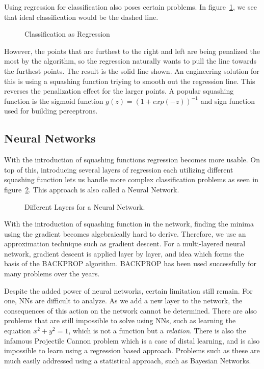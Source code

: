 \documentclass{ecctd01} %
\begin{document}
Using regression for classification also poses certain problems. In
figure~\ref{clasreg1}, we see that ideal classification would be the
dashed line. 

\begin{figure}[htpb]
\vspace{4.0cm}
\caption{\label{clasreg1} Classification as Regression}
\end{figure}

However, the points that are furthest to the right and left are being
penalized the most by the algorithm, so the regression naturally wants
to pull the line towards the furthest points. The result is the solid
line shown. An engineering solution for this is using a squashing
function triying to smooth out the regression line. This reverses the
penalization effect for the larger points. A popular squashing
function is the sigmoid function $g(z) = (1 + exp(-z))^{-1}$ and sign
function used for building perceptrons. 

\subsection{Neural Networks}

With the introduction of squashing functions regression becomes more
usable. On top of this, introducing several layers of regression each
utilizing different squashing function lets us handle more complex
classification problems as seen in figure~\ref{nn1}. This approach is
also called a Neural Network.

\begin{figure}[htpb]
\vspace{3.0cm}
\caption{\label{nn1} Different Layers for a Neural Network.}
\end{figure}

With the introduction of squashing function in the network, finding
the minima using the gradient becomes algebraically hard to
derive. Therefore, we use an approximation technique such as gradient
descent. For a multi-layered neural network, gradient descent is
applied layer by layer, and idea which forms the basis of the BACKPROP
algorithm. BACKPROP has been used successfully for many problems
over the years.

Despite the added power of neural networks, certain limitation still
remain. For one, NNs are difficult to analyze. As we add a new layer
to the network, the consequences of this action on the network cannot be
determined. There are also problems that are still impossible to solve
using NNs, such as learning the equation $x^2+y^2=1$, which is not a
function but a {\em relation}. There is also the infamous Projectile
Cannon problem which is a case of distal learning, and is also
impossible to learn using a regression based approach. Problems such
as these are much easily addressed using a statistical approach, such
as Bayesian Networks. 
\end{document}
